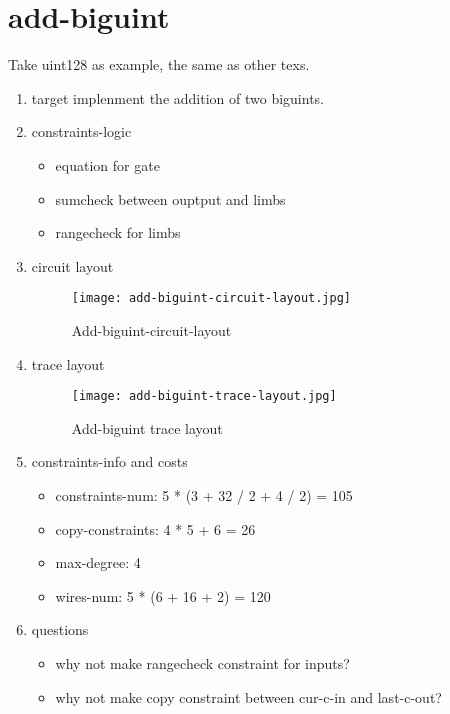 \section{add-biguint}
\label{add-biguint}

Take uint128 as example, the same as other texs.

\begin{enumerate}
    \item target
        implenment the addition of two biguints.
    \item constraints-logic
        \begin{itemize}
            \item equation for gate
            \item sumcheck between ouptput and limbs
            \item rangecheck for limbs
        \end{itemize}
    \item circuit layout
        \begin{figure}[!ht]
            \centering
            \texttt{[image: add-biguint-circuit-layout.jpg]}
            \caption{Add-biguint-circuit-layout}
            \label{fig:add-biguint-circuit-layout}
        \end{figure}

    \item trace layout
        \begin{figure}[!ht]
            \centering
            \texttt{[image: add-biguint-trace-layout.jpg]}
            \caption{Add-biguint trace layout}
            \label{fig:add-biguint-trace-layout}
        \end{figure}
    
    \item constraints-info and costs
        \begin{itemize}
            \item constraints-num: 5 * (3 + 32 / 2 + 4 / 2) = 105
            \item copy-constraints: 4 * 5 + 6 = 26
            \item max-degree: 4
            \item wires-num: 5 * (6 + 16 + 2) = 120
        \end{itemize}

    \item questions
        \begin{itemize}
            \item why not make rangecheck constraint for inputs?
            \item why not make copy constraint between cur-c-in and last-c-out?
        \end{itemize}

\end{enumerate}